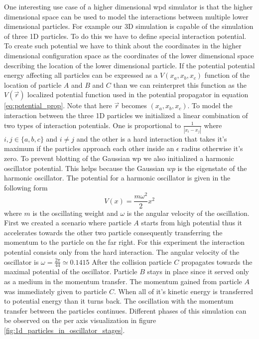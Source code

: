 One interesting use case of a higher dimensional \acrshort{wpd} simulator is that the higher dimensional space can be used to model the interactions between multiple lower dimensional particles.
For example our 3D simulation is capable of the simulation of three 1D particles.
To do this we have to define special interaction potential.
To create such potential we have to think about the coordinates in the higher dimensional configuration space as the coordinates of the lower dimensional space describing the location of the lower dimensional particle.
If the potential potential energy affecting all particles can be expressed as a $V(x_a, x_b, x_c)$ function of the location of particle $A$ and $B$ and $C$ than we can reinterpret this function as the $V(\vec{r})$ localized potential function used in the potential propagator in equation \ref{eq:potential_prop}.
Note that here $\vec{r}$ becomes $(x_a, x_b, x_c)$.
To model the interaction between the three 1D particles we initialized a linear combination of two types of interaction potentials.
One is proportional to $\frac{1}{|x_i - x_j|}$ where $i,j\in\{a,b,c\}$ and $i\neq j$ and the other is a hard interaction that takes it's maximum if the particles approach each other inside an $\epsilon$ radius otherwise it's zero.
To prevent blotting of the Gaussian \acrshort{wp} we also initialized a harmonic oscillator potential.
This helps because the Gaussian $wp$ is the eigenstate of the harmonic oscillator.
The potential for a harmonic oscillator is given in the following form
\begin{equation}
	\label{eq:harmonic_osc}
	V(x) = \frac{m\omega^2}{2}x^2
\end{equation}
where $m$ is the oscillating weight and $\omega$ is the angular velocity of the oscillation.
First we created a scenario where particle $A$ starts from high potential thus it accelerates towards the other two particle consequently transferring the momentum to the particle on the far right.
For this experiment the interaction potential consists only from the hard interaction.
The angular velocity of the oscillator is $\omega = \frac{2\pi}{44} \simeq 0.1415$
After the collision particle $C$ propagates towards the maximal potential of the oscillator.
Particle $B$ stays in place since it served only as a medium in the momentum transfer.
The momentum gained from particle $A$ was immediately given to particle $C$.
When all of it's kinetic energy is transferred to potential energy than it turns back.
The oscillation with the momentum transfer between the particles continues.
Different phases of this simulation can be observed on the per axis visualization in figure \ref{fig:1d_particles_in_oscillator_stages}.
